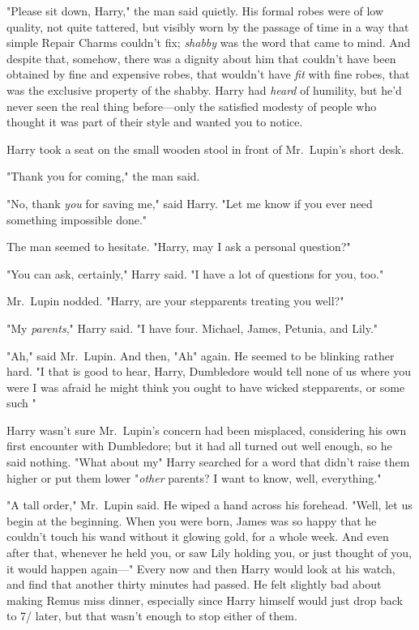 "Please sit down, Harry," the man said quietly. His formal robes were of low
quality, not quite tattered, but visibly worn by the passage of time in a way
that simple Repair Charms couldn't fix; \emph{shabby} was the word that came to
mind. And despite that, somehow, there was a dignity about him that couldn't
have been obtained by fine and expensive robes, that wouldn't have \emph{fit}
with fine robes, that was the exclusive property of the shabby. Harry had
\emph{heard} of humility, but he'd never seen the real thing before---only the
satisfied modesty of people who thought it was part of their style and wanted
you to notice.

Harry took a seat on the small wooden stool in front of Mr.~Lupin's short desk.

"Thank you for coming," the man said.

"No, thank \emph{you} for saving me," said Harry. "Let me know if you ever need
something impossible done."

The man seemed to hesitate. "Harry, may I{\el} ask a personal question?"

"You can ask, certainly," Harry said. "I have a lot of questions for you, too."

Mr.~Lupin nodded. "Harry, are your stepparents treating you well?"

"My \emph{parents}," Harry said. "I have four. Michael, James, Petunia, and
Lily."

"Ah," said Mr.~Lupin. And then, "Ah" again. He seemed to be blinking rather
hard. "I{\el} that is good to hear, Harry, Dumbledore would tell none of us
where you were{\el} I was afraid he might think you ought to have wicked
stepparents, or some such{\el} "

Harry wasn't sure Mr.~Lupin's concern had been misplaced, considering his own
first encounter with Dumbledore; but it had all turned out well enough, so he
said nothing. "What about my{\el}" Harry searched for a word that didn't
raise them higher or put them lower{\el} "\emph{other} parents? I want to
know, well, everything."

"A tall order," Mr.~Lupin said. He wiped a hand across his forehead. "Well, let
us begin at the beginning. When you were born, James was so happy that he
couldn't touch his wand without it glowing gold, for a whole week. And even
after that, whenever he held you, or saw Lily holding you, or just thought of
you, it would happen again\mbox{---}"
\sbreak
Every now and then Harry would look at his watch, and find that another thirty
minutes had passed. He felt slightly bad about making Remus miss dinner,
especially since Harry himself would just drop back to 7\PM/ later, but that
wasn't enough to stop either of them.

